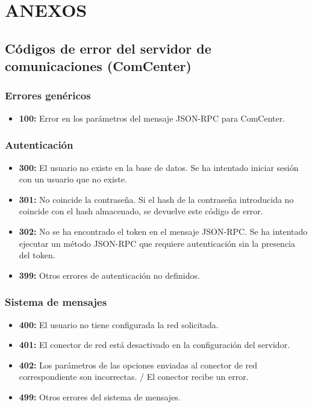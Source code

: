 \documentclass[spanish,12pt, a4paper, twoside]{paper}
\let\oldsection\section
\def\section{\cleardoublepage\oldsection}
\begin{document}
\section{ANEXOS}

\subsection{Códigos de error del servidor de comunicaciones (ComCenter)}

\subsubsection{Errores genéricos}

\begin{itemize}
\item\textbf{100:} Error en los parámetros del mensaje JSON-RPC para ComCenter.
\end{itemize}

\subsubsection{Autenticación}

\begin{itemize}
\item\textbf{300:} El usuario no existe en la base de datos. Se ha intentado iniciar sesión con un usuario que no existe.
\item\textbf{301:} No coincide la contraseña. Si el hash de la contraseña introducida no coincide con el hash almacenado, se devuelve este código de error.
\item\textbf{302:} No se ha encontrado el token en el mensaje JSON-RPC. Se ha intentado ejecutar un método JSON-RPC que requiere autenticación sin la presencia del token.
\item\textbf{399:} Otros errores de autenticación no definidos.
\end{itemize}

\subsubsection{Sistema de mensajes}

\begin{itemize}
\item\textbf{400:} El usuario no tiene configurada la red solicitada.
\item\textbf{401:} El conector de red está desactivado en la configuración del servidor.
\item\textbf{402:} Los parámetros de las opciones enviadas al conector de red correspondiente son incorrectas. / El conector recibe un error.
\item\textbf{499:} Otros errores del sistema de mensajes.
\end{itemize}
\end{document}
